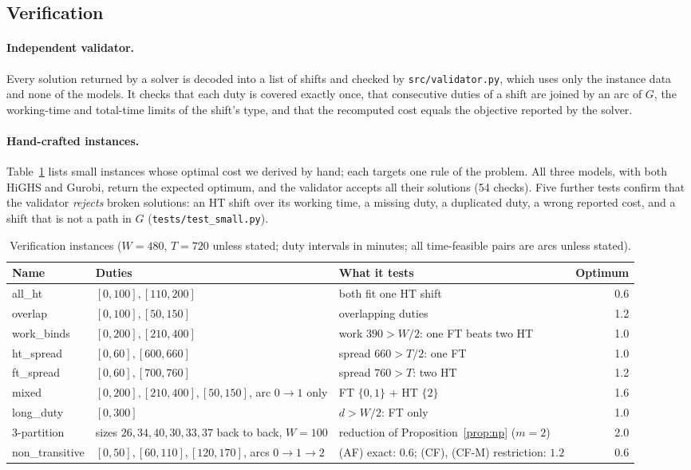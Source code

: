 \subsection{Verification}
\label{sec:verification}

\paragraph{Independent validator.} Every solution returned by a solver is
decoded into a list of shifts and checked by \texttt{src/validator.py},
which uses only the instance data and none of the models. It checks that each
duty is covered exactly once, that consecutive duties of a shift are joined
by an arc of $G$, the working-time and total-time limits of the shift's type,
and that the recomputed cost equals the objective reported by the solver.

\paragraph{Hand-crafted instances.} Table~\ref{tab:tests} lists small
instances whose optimal cost we derived by hand; each targets one rule of the
problem. All three models, with both HiGHS and Gurobi, return the expected
optimum, and the validator accepts all their solutions (54 checks). Five
further tests confirm that the validator \emph{rejects} broken solutions: an
HT shift over its working time, a missing duty, a duplicated duty, a wrong
reported cost, and a shift that is not a path in $G$
(\texttt{tests/test\_small.py}).

\begin{table}[ht]
\centering
\small
\caption{Verification instances ($W=480$, $T=720$ unless stated; duty
intervals in minutes; all time-feasible pairs are arcs unless stated).}
\label{tab:tests}
\begin{tabular}{@{}lp{5.0cm}p{5.0cm}r@{}}
\toprule
Name & Duties & What it tests & Optimum \\
\midrule
all\_ht & $[0,100],[110,200]$ & both fit one HT shift & 0.6 \\
overlap & $[0,100],[50,150]$ & overlapping duties & 1.2 \\
work\_binds & $[0,200],[210,400]$ & work $390>W/2$: one FT beats two HT & 1.0 \\
ht\_spread & $[0,60],[600,660]$ & spread $660>T/2$: one FT & 1.0 \\
ft\_spread & $[0,60],[700,760]$ & spread $760>T$: two HT & 1.2 \\
mixed & $[0,200],[210,400],[50,150]$, arc $0\to1$ only & FT $\{0,1\}$ + HT $\{2\}$ & 1.6 \\
long\_duty & $[0,300]$ & $d>W/2$: FT only & 1.0 \\
3-partition & sizes $26,34,40,30,33,37$ back to back, $W=100$ & reduction of
  Proposition~\ref{prop:np} ($m=2$) & 2.0 \\
non\_transitive & $[0,50],[60,110],[120,170]$, arcs $0\to1\to2$ &
  (AF) exact: $0.6$; (CF), (CF-M) restriction: $1.2$ & 0.6 \\
\bottomrule
\end{tabular}
\end{table}

